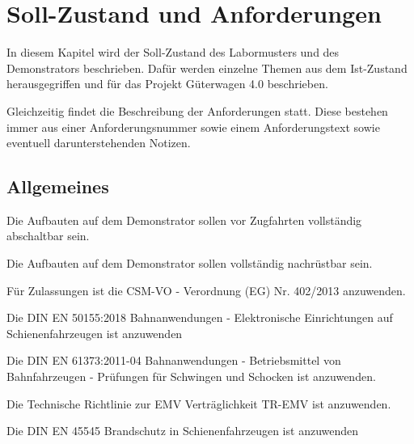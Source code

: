 \section{Soll-Zustand und Anforderungen}
In diesem Kapitel wird der Soll-Zustand des Labormusters und des Demonstrators beschrieben. Dafür werden einzelne Themen aus dem Ist-Zustand herausgegriffen und für das Projekt Güterwagen 4.0 beschrieben.\par
Gleichzeitig findet die Beschreibung der Anforderungen statt. Diese bestehen immer aus einer Anforderungsnummer sowie einem Anforderungstext sowie eventuell darunterstehenden Notizen.%

\subsection{Allgemeines}
\begin{feat}
Die Aufbauten auf dem Demonstrator sollen vor Zugfahrten vollständig abschaltbar sein.
\end{feat}
\begin{feat}
Die Aufbauten auf dem Demonstrator sollen vollständig nachrüstbar sein.
\end{feat}
\begin{feat}
Für Zulassungen ist die CSM-VO - Verordnung (EG) Nr. 402/2013 anzuwenden.
\end{feat}
\begin{feat}
Die \acrshort{DIN} \acrshort{EN} 50155:2018 Bahnanwendungen - Elektronische Einrichtungen auf Schienenfahrzeugen ist anzuwenden
\end{feat}
\begin{feat}
Die \acrshort{DIN} \acrshort{EN} 61373:2011-04 Bahnanwendungen - Betriebsmittel von Bahnfahrzeugen - Prüfungen für Schwingen und Schocken ist anzuwenden.
\end{feat}
\begin{feat}
Die Technische Richtlinie zur EMV Verträglichkeit TR-EMV ist anzuwenden.
\end{feat}
\begin{feat}
Die \acrshort{DIN} \acrshort{EN} 45545 Brandschutz in Schienenfahrzeugen ist anzuwenden
\end{feat}

